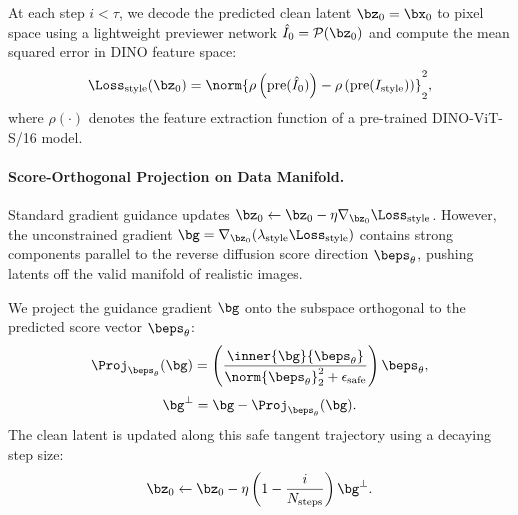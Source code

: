 At each step $i < \tau$, we decode the predicted clean latent $\bz_0 = \bx_0$ to pixel space using a lightweight previewer network $\hat{I}_0 = \mathcal{P}(\bz_0)$ and compute the mean squared error in DINO feature space:
\begin{equation}
    \Loss_{\text{style}}(\bz_0) = \norm{ \rho\left( \text{pre}(\hat{I}_0) \right) - \rho\left( \text{pre}(I_{\text{style}}) \right) }_2^2,
\end{equation}
where $\rho(\cdot)$ denotes the feature extraction function of a pre-trained DINO-ViT-S/16 model.

\paragraph{Score-Orthogonal Projection on Data Manifold.}
Standard gradient guidance updates $\bz_0 \leftarrow \bz_0 - \eta \nabla_{\bz_0} \Loss_{\text{style}}$. However, the unconstrained gradient $\bg = \nabla_{\bz_0} (\lambda_{\text{style}} \Loss_{\text{style}})$ contains strong components parallel to the reverse diffusion score direction $\beps_\theta$, pushing latents off the valid manifold of realistic images.

We project the guidance gradient $\bg$ onto the subspace orthogonal to the predicted score vector $\beps_\theta$:
\begin{equation}
    \Proj_{\beps_\theta}(\bg) = \left( \frac{\inner{\bg}{\beps_\theta}}{\norm{\beps_\theta}_2^2 + \epsilon_{\text{safe}}} \right) \beps_\theta,
\end{equation}
\begin{equation}
    \bg^\perp = \bg - \Proj_{\beps_\theta}(\bg).
\end{equation}
The clean latent is updated along this safe tangent trajectory using a decaying step size:
\begin{equation}
    \bz_0 \leftarrow \bz_0 - \eta \left( 1 - \frac{i}{N_{\text{steps}}} \right) \bg^\perp.
    \label{eq:latent_update}
\end{equation}

